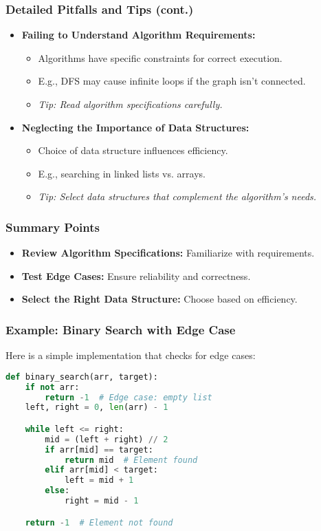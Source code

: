 \documentclass[aspectratio=169]{beamer}
\begin{document}
\begin{frame}[fragile]
    \frametitle{Detailed Pitfalls and Tips (cont.)}
    \begin{itemize}
        \item \textbf{Failing to Understand Algorithm Requirements:}
            \begin{itemize}
                \item Algorithms have specific constraints for correct execution.
                \item E.g., DFS may cause infinite loops if the graph isn't connected.
                \item \textit{Tip: Read algorithm specifications carefully.}
            \end{itemize}
        
        \item \textbf{Neglecting the Importance of Data Structures:}
            \begin{itemize}
                \item Choice of data structure influences efficiency.
                \item E.g., searching in linked lists vs. arrays.
                \item \textit{Tip: Select data structures that complement the algorithm's needs.}
            \end{itemize}
    \end{itemize}
\end{frame}

\begin{frame}
    \frametitle{Summary Points}
    \begin{itemize}
        \item \textbf{Review Algorithm Specifications:} Familiarize with requirements.
        \item \textbf{Test Edge Cases:} Ensure reliability and correctness.
        \item \textbf{Select the Right Data Structure:} Choose based on efficiency.
    \end{itemize}
\end{frame}

\begin{frame}[fragile]
    \frametitle{Example: Binary Search with Edge Case}
    Here is a simple implementation that checks for edge cases:
    \begin{lstlisting}[language=Python]
def binary_search(arr, target):
    if not arr:
        return -1  # Edge case: empty list
    left, right = 0, len(arr) - 1

    while left <= right:
        mid = (left + right) // 2
        if arr[mid] == target:
            return mid  # Element found
        elif arr[mid] < target:
            left = mid + 1
        else:
            right = mid - 1

    return -1  # Element not found
    \end{lstlisting}
\end{frame}
\end{document}
